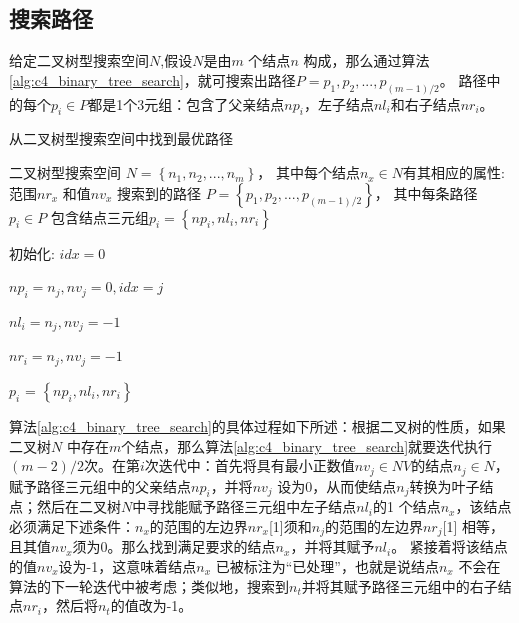         \subsection{搜索路径}

        给定二叉树型搜索空间$N$,假设$N$是由$m$ 个结点$n$ 构成，那么通过算法\ref{alg:c4_binary_tree_search}，就可搜索出路径$P={p_1,p_2,...,p_{(m-1)/2}}$。 路径中的每个$p_i \in P$都是1个3元组：包含了父亲结点$np_i$，左子结点$nl_i$和右子结点$nr_i$。

        \begin{algorithm}
    	\renewcommand{\algorithmicrequire}{\textbf{输入:}}	
        \renewcommand{\algorithmicensure}{\textbf{输出:}}
    	\caption{从二叉树型搜索空间中找到最优路径}
    	\label{alg:c4_binary_tree_search}
    	\begin{algorithmic}[1]
    		\REQUIRE 二叉树型搜索空间 $N=\left\{n_1,n_2,...,n_m\right\}$， 其中每个结点$n_x \in N$有其相应的属性: 范围$nr_x$ 和值$nv_x$
    		\ENSURE 搜索到的路径 $P=\left\{p_1,p_2,...,p_{(m-1)/2}\right\}$， 其中每条路径$p_{i} \in P$ 包含结点三元组$p_{i}=\left\{np_{i},nl_{i},nr_{i}\right\}$

          \STATE 初始化: $idx=0$

          \STATE $np_i = n_j, nv_j = 0, idx = j$
          \ENDIF

          \STATE $nl_i = n_j, nv_j = -1$
          \ENDIF

          \STATE $nr_i = n_j, nv_j = -1$
          \ENDIF

          \ENDFOR

          \STATE $p_{i}$ = $\left\{ np_{i},nl_{i},nr_{i} \right\}$

          \ENDFOR
    	  \end{algorithmic}
        \end{algorithm}

        算法\ref{alg:c4_binary_tree_search}的具体过程如下所述：根据二叉树的性质，如果二叉树$N$ 中存在$m$个结点，那么算法\ref{alg:c4_binary_tree_search}就要迭代执行$(m-2)/2$次。在第$i$次迭代中：首先将具有最小正数值$nv_j \in NV$的结点$n_j \in N$，赋予路径三元组中的父亲结点$np_i$，并将$nv_j$ 设为0，从而使结点$n_j$转换为叶子结点；然后在二叉树$N$中寻找能赋予路径三元组中左子结点$nl_i$的1 个结点$n_x$，该结点必须满足下述条件：$n_x$的范围的左边界$nr_x$[1]须和$n_j$的范围的左边界$nr_j$[1] 相等，且其值$nv_x$须为0。那么找到满足要求的结点$n_x$，并将其赋予$nl_i$。 紧接着将该结点的值$nv_x$设为-1，这意味着结点$n_x$ 已被标注为``已处理''，也就是说结点$n_x$ 不会在算法的下一轮迭代中被考虑；类似地，搜索到$n_t$并将其赋予路径三元组中的右子结点$nr_i$，然后将$n_t$的值改为-1。

